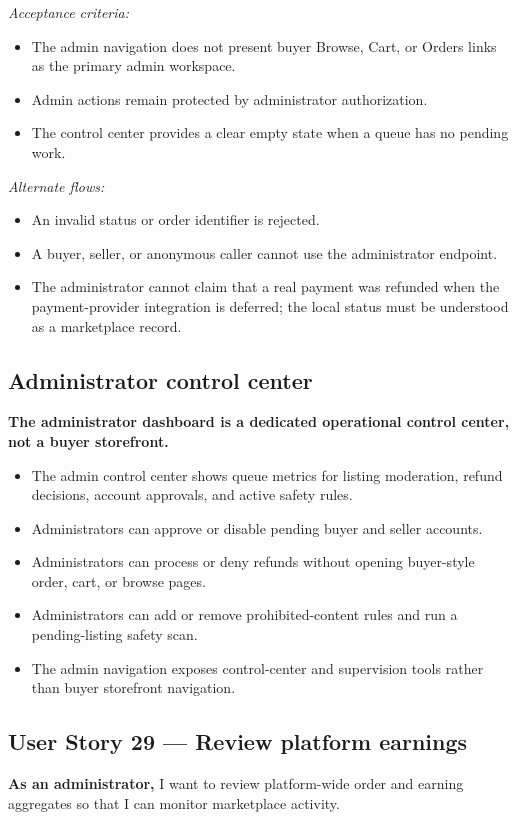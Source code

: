 \documentclass[11pt]{scrreprt}
\begin{document}
\textit{Acceptance criteria:}
\begin{itemize}
\item The admin navigation does not present buyer Browse, Cart, or Orders
links as the primary admin workspace.
\item Admin actions remain protected by administrator authorization.
\item The control center provides a clear empty state when a queue has no
pending work.
\end{itemize}

\textit{Alternate flows:}
\begin{itemize}
\item An invalid status or order identifier is rejected.
\item A buyer, seller, or anonymous caller cannot use the administrator
endpoint.
\item The administrator cannot claim that a real payment was refunded when the
payment-provider integration is deferred; the local status must be understood
as a marketplace record.
\end{itemize}

\subsection{Administrator control center}
\textbf{The administrator dashboard is a dedicated operational control
center, not a buyer storefront.}
\begin{itemize}
\item The admin control center shows queue metrics for listing moderation,
refund decisions, account approvals, and active safety rules.
\item Administrators can approve or disable pending buyer and seller accounts.
\item Administrators can process or deny refunds without opening buyer-style
order, cart, or browse pages.
\item Administrators can add or remove prohibited-content rules and run a
pending-listing safety scan.
\item The admin navigation exposes control-center and supervision tools rather
than buyer storefront navigation.
\end{itemize}

\subsection{User Story 29 --- Review platform earnings}
\textbf{As an administrator,} I want to review platform-wide order and earning
aggregates so that I can monitor marketplace activity.
\end{document}
